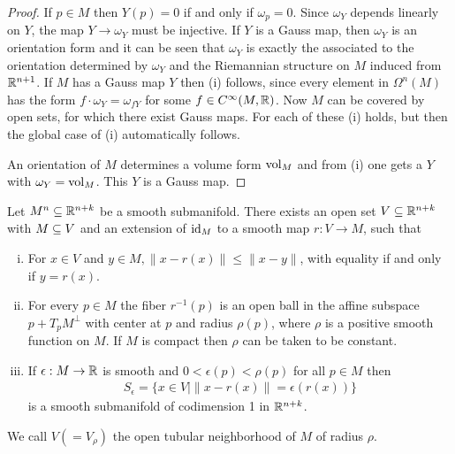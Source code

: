\begin{proof}
  If $p\in M$ then $Y(p) = 0$ if and only if $\omega_p = 0$. Since $\omega_Y$ depends linearly
  on $Y$, the map $Y\to\omega_Y$ must be injective. If $Y$ is a Gauss map, then $\omega_Y$ is an
  orientation form and it can be seen that $\omega_Y$ is exactly the  associated
  to the orientation determined by $\omega_Y$ and the Riemannian structure on $M$ induced
  from ${\mathbb{R}}^{n+1}$. If $M$ has a Gauss map $Y$ then (i) follows, since every element in
  $\Omega^n(M)$ has the form $f\cdot\omega_Y = \omega_{fY}$ for some $f\in C^\infty(M, {\mathbb{R}})$. 
  Now $M$ can be covered by open sets, for which there exist Gauss maps. For each of these (i)
  holds, but then the global case of (i) automatically follows.

  An orientation of $M$ determines a volume form $\mathrm{vol}_M$ and from (i) one gets a $Y$
  with $\omega_Y = \mathrm{vol}_M$. This $Y$ is a Gauss map.  
\end{proof}

\begin{theorem}\label{theorem:9-23}
  Let $M^n\subseteq {\ensuremath{\mathbb{R}}}^{n+k}$ be a smooth submanifold. There exists an open set $V\subseteq {\ensuremath{\mathbb{R}}}^{n+k}$ with 
  $M\subseteq V$ and an extension of $\operatorname{id}_M$ to a smooth map $r:V\to M$, such that 
  \begin{enumerate}[(i)]
    \item For $x\in V$ and $y\in M, \|x-r(x)\|\le \|x-y\|$, with equality if and only if 
      $y=r(x)$.
    \item For every $p\in M$ the fiber $r^{-1}(p)$ is an open ball in the affine subspace 
      $p + T_pM^\perp$ with center at $p$ and radius $\rho(p)$, where $\rho$ is a positive 
      smooth function on $M$. If $M$ is compact then $\rho$ can be taken to be constant.
    \item If $\epsilon:M\to{\ensuremath{\mathbb{R}}}$ is smooth and $0<\epsilon(p)<\rho(p)$ for all $p\in M$ then 
      \begin{align*}
        S_\epsilon = \{x\in V \mid \|x-r(x)\| = \epsilon(r(x)) \}
      \end{align*}
      is a smooth submanifold of codimension 1 in ${\mathbb{R}}^{n+k}$.
  \end{enumerate}
  We call $V(=V_\rho)$ the open tubular neighborhood of $M$ of radius $\rho$.
\end{theorem}

